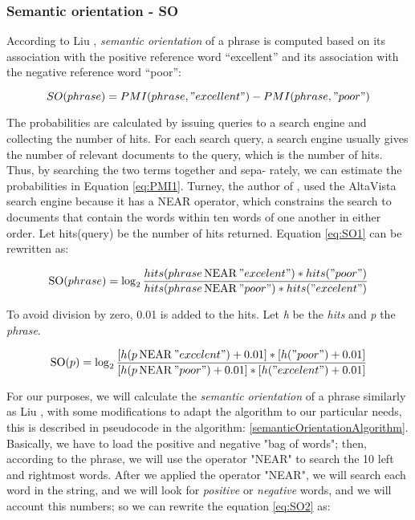 \subsubsection{Semantic orientation - SO}\label{SO}

According to Liu \cite[p. 474]{L2011},  \emph{semantic orientation} of a phrase is computed based on its association with the positive reference word “excellent” and its association with the negative reference word “poor”:

\begin{equation} \label{eq:SO1}
	SO(phrase) = PMI(phrase, "excellent") - PMI(phrase, "poor")
\end{equation}	

The probabilities are calculated by issuing queries to a search engine and collecting the number of hits. For each search query, a search engine usually gives the number of relevant documents to the query, which is the number of hits. Thus, by searching the two terms together and sepa- rately, we can estimate the probabilities in Equation \ref{eq:PMI1}. Turney, the author of \cite[][]{T2002}, used the AltaVista search engine because it has a NEAR operator, which constrains the search to documents that contain the words within ten words of one another in either order. Let hits(query) be the number of hits returned. Equation \ref{eq:SO1} can be rewritten as:

\begin{equation} \label{eq:SO2}
\operatorname{SO}(phrase) = \log_{2}\frac{hits(phrase \operatorname{NEAR} "excelent") * hits("poor")}{hits(phrase \operatorname{NEAR} "poor") * hits("excelent")}
\end{equation}

To avoid division by zero, 0.01 is added to the hits. Let \emph{h} be the \emph{hits} and \emph{p} the \emph{phrase}.

\begin{equation} \label{eq:SO3}
\operatorname{SO}(p) = \log_{2}\frac{[ h(p \operatorname{NEAR} "excelent") + 0.01]* [ h("poor")+0.01]}{[ h(p \operatorname{NEAR} "poor") + 0.01] *[ h("excelent")+0.01]}
\end{equation}

For our purposes, we will calculate the \emph{semantic orientation} of a phrase similarly as Liu \cite[][]{L2011}, with some modifications to adapt the algorithm to our particular needs, this is described in pseudocode in the algorithm: \ref{semanticOrientationAlgorithm}. Basically, we have to load the positive and negative "bag of words"; then, according to the phrase, we will use the operator "NEAR" to search the 10 left and rightmost words. After we applied the operator "NEAR", we will search each word in the string, and we will look for \emph{positive} or \emph{negative} words, and we will account this numbers; so we can rewrite the equation \ref{eq:SO2} as:

